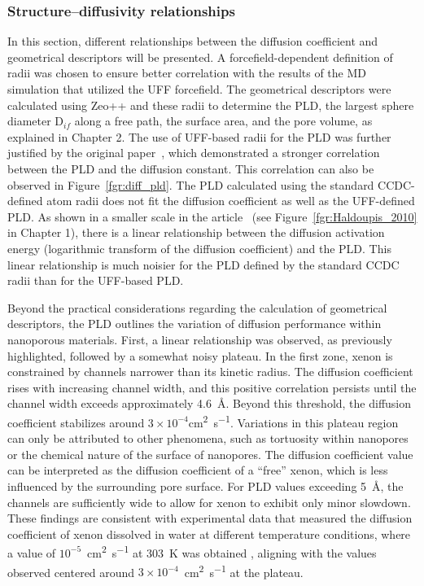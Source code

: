 \documentclass[main]{subfiles}
\begin{document}
\subsubsection{Structure--diffusivity relationships}\label{sct:xenon_diff_screen}

In this section, different relationships between the diffusion coefficient and geometrical descriptors will be presented. A forcefield-dependent definition of radii was chosen to ensure better correlation with the results of the MD simulation that utilized the UFF forcefield. The geometrical descriptors were calculated using Zeo++ and these radii to determine the PLD, the largest sphere diameter D$_{if}$ along a free path, the surface area, and the pore volume, as explained in Chapter 2. The use of UFF-based radii for the PLD was further justified by the original paper~\cite{Hung_2021}, which demonstrated a stronger correlation between the PLD and the diffusion constant. This correlation can also be observed in Figure~\ref{fgr:diff_pld}. The PLD calculated using the standard CCDC-defined atom radii does not fit the diffusion coefficient as well as the UFF-defined PLD. As shown in a smaller scale in the article~\cite{Haldoupis_2010} (see Figure~\ref{fgr:Haldoupis_2010} in Chapter 1), there is a linear relationship between the diffusion activation energy (logarithmic transform of the diffusion coefficient) and the PLD. This linear relationship is much noisier for the PLD defined by the standard CCDC radii than for the UFF-based PLD.

Beyond the practical considerations regarding the calculation of geometrical descriptors, the PLD outlines the variation of diffusion performance within nanoporous materials. First, a linear relationship was observed, as previously highlighted, followed by a somewhat noisy plateau. In the first zone, xenon is constrained by channels narrower than its kinetic radius. The diffusion coefficient rises with increasing channel width, and this positive correlation persists until the channel width exceeds approximately \SI{4.6}{\angstrom}. Beyond this threshold, the diffusion coefficient stabilizes around $3\times 10^{-4}$\si{\square\cm\per\s}. Variations in this plateau region can only be attributed to other phenomena, such as tortuosity within nanopores or the chemical nature of the surface of nanopores. The diffusion coefficient value can be interpreted as the diffusion coefficient of a ``free'' xenon, which is less influenced by the surrounding pore surface. For PLD values exceeding \SI{5}{\angstrom}, the channels are sufficiently wide to allow for xenon to exhibit only minor slowdown. These findings are consistent with experimental data that measured the diffusion coefficient of xenon dissolved in water at different temperature conditions, where a value of $10^{-5}$~\si{\square\cm\per\s} at \SI{303}{\kelvin} was obtained \autocite{Wise1968}, aligning with the values observed centered around $3\times 10^{-4}$~\si{\square\cm\per\s} at the plateau.
\end{document}
